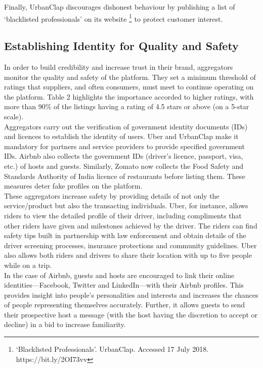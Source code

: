 \documentclass[a4paper, 12pt]{article}
\begin{document}
Finally, UrbanClap discourages dishonest behaviour by publishing a list of ‘blacklisted professionals’ on its website \footnote{‘Blacklisted Professionals’. UrbanClap. Accessed 17 July 2018. https://bit.ly/2OI73vv}  to protect customer interest. \\
                    
                    \subsection{Establishing Identity for Quality and Safety }
                    
                    In order to build credibility and increase trust in their brand, aggregators monitor the quality and safety of the platform. They set a minimum threshold of ratings that suppliers, and often consumers, must meet to continue operating on the platform. Table 2 highlights the importance accorded to higher ratings, with more than 90\% of the listings having a rating of 4.5 stars or above (on a 5-star scale). \\

Aggregators carry out the verification of government identity documents (IDs) and licences to establish the identity of users. Uber and UrbanClap make it mandatory for partners and service providers to provide specified government IDs. Airbnb also collects the government IDs (driver’s licence, passport, visa, etc.) of hosts and guests. Similarly, Zomato now collects the Food Safety and Standards Authority of India licence of restaurants before listing them. These measures deter fake profiles on the platform.\\

These aggregators increase safety by providing details of not only the service/product but also the transacting individuals. Uber, for instance, allows riders to view the detailed profile of their driver, including compliments that other riders have given and milestones achieved by the driver. The riders can find safety tips built in partnership with law enforcement and obtain details of the driver screening processes, insurance protections and community guidelines. Uber also allows both riders and drivers to share their location with up to five people while on a trip. \\

In the case of Airbnb, guests and hosts are encouraged to link their online identities—Facebook, Twitter and LinkedIn—with their Airbnb profiles. This provides insight into people’s personalities and interests and increases the chances of people representing themselves accurately. Further, it allows guests to send their prospective host a message (with the host having the discretion to accept or decline) in a bid to increase familiarity. \\
\end{document}
